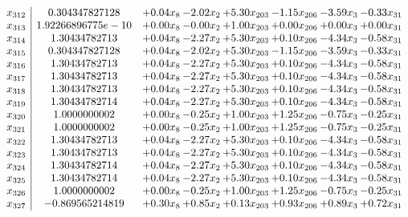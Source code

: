 \documentclass[8pt]{article}
\begin{document}
\[\begin{array}{c| c c@{\hskip 2pt} c@{\hskip 2pt} c@{\hskip 2pt} c@{\hskip 2pt} c@{\hskip 2pt} c@{\hskip 2pt} }
 x_{312}   &  0.304347827128 & +  0.04 x_{8} & -2.02 x_{2} & +  5.30 x_{203} & -1.15 x_{206} & -3.59 x_{3} & -0.33 x_{31}\\
 x_{313}   &  1.92266896775e-10 & +  0.00 x_{8} & -0.00 x_{2} & +  1.00 x_{203} & +  0.00 x_{206} & +  0.00 x_{3} & +  0.00 x_{31}\\
 x_{314}   &  1.30434782713 & +  0.04 x_{8} & -2.27 x_{2} & +  5.30 x_{203} & +  0.10 x_{206} & -4.34 x_{3} & -0.58 x_{31}\\
 x_{315}   &  0.304347827128 & +  0.04 x_{8} & -2.02 x_{2} & +  5.30 x_{203} & -1.15 x_{206} & -3.59 x_{3} & -0.33 x_{31}\\
 x_{316}   &  1.30434782713 & +  0.04 x_{8} & -2.27 x_{2} & +  5.30 x_{203} & +  0.10 x_{206} & -4.34 x_{3} & -0.58 x_{31}\\
 x_{317}   &  1.30434782713 & +  0.04 x_{8} & -2.27 x_{2} & +  5.30 x_{203} & +  0.10 x_{206} & -4.34 x_{3} & -0.58 x_{31}\\
 x_{318}   &  1.30434782713 & +  0.04 x_{8} & -2.27 x_{2} & +  5.30 x_{203} & +  0.10 x_{206} & -4.34 x_{3} & -0.58 x_{31}\\
 x_{319}   &  1.30434782714 & +  0.04 x_{8} & -2.27 x_{2} & +  5.30 x_{203} & +  0.10 x_{206} & -4.34 x_{3} & -0.58 x_{31}\\
 x_{320}   &  1.0000000002 & +  0.00 x_{8} & -0.25 x_{2} & +  1.00 x_{203} & +  1.25 x_{206} & -0.75 x_{3} & -0.25 x_{31}\\
 x_{321}   &  1.0000000002 & +  0.00 x_{8} & -0.25 x_{2} & +  1.00 x_{203} & +  1.25 x_{206} & -0.75 x_{3} & -0.25 x_{31}\\
 x_{322}   &  1.30434782713 & +  0.04 x_{8} & -2.27 x_{2} & +  5.30 x_{203} & +  0.10 x_{206} & -4.34 x_{3} & -0.58 x_{31}\\
 x_{323}   &  1.30434782713 & +  0.04 x_{8} & -2.27 x_{2} & +  5.30 x_{203} & +  0.10 x_{206} & -4.34 x_{3} & -0.58 x_{31}\\
 x_{324}   &  1.30434782714 & +  0.04 x_{8} & -2.27 x_{2} & +  5.30 x_{203} & +  0.10 x_{206} & -4.34 x_{3} & -0.58 x_{31}\\
 x_{325}   &  1.30434782714 & +  0.04 x_{8} & -2.27 x_{2} & +  5.30 x_{203} & +  0.10 x_{206} & -4.34 x_{3} & -0.58 x_{31}\\
 x_{326}   &  1.0000000002 & +  0.00 x_{8} & -0.25 x_{2} & +  1.00 x_{203} & +  1.25 x_{206} & -0.75 x_{3} & -0.25 x_{31}\\
 x_{327}   &  -0.869565214819 & +  0.30 x_{8} & +  0.85 x_{2} & +  0.13 x_{203} & +  0.93 x_{206} & +  0.89 x_{3} & +  0.72 x_{31}\\

\end{array}\]
\end{document}
